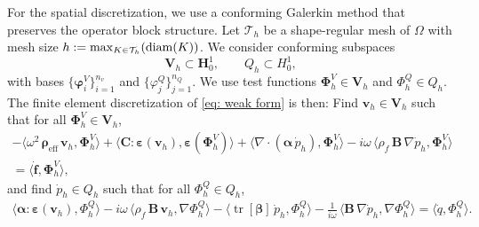 \documentclass[pdflatex,sn-mathphys-num]{sn-jnl}
\theoremstyle{thmstyleone}%
\theoremstyle{thmstyletwo}%
\theoremstyle{thmstylethree}%
\def \div {\nabla\cdot}
\theoremstyle{definition}
\begin{document}
	
	
	
	
	
	For the spatial discretization, we use a conforming Galerkin method that preserves the operator block structure. Let $\mathcal{T}_h$ be a shape-regular mesh of $\Omega$ with mesh size $h:= \max_{K\in\mathcal{T}_h}({\rm diam}(K))$. 
	We consider conforming subspaces
	\[
	\bm{V}_h \subset \bm{H}_{0}^{1}, 
	\qquad 
	Q_h \subset H_{0}^{1},
	\]
	with bases $\{\boldsymbol{\varphi}_i^V\}_{i=1}^{n_{{{v}}}}$ and $\{\varphi_j^Q\}_{j=1}^{n_Q}$. 
	We use test functions $\boldsymbol{\Phi}_h^V \in \bm{V}_h$ and $\Phi_h^{{Q}} \in Q_h$.
	The finite element discretization of \eqref{eq: weak form} is then: 
	Find $\mathbf{v}_h \in \bm{V}_h$ such that for all $\boldsymbol{\Phi}_h^V \in \bm{V}_h$,
	\begin{align*}
		-\langle \omega^2\, \boldsymbol{\rho}_{\mathrm{eff}}\, \mathbf{v}_h, \boldsymbol{\Phi}_h^V \rangle
		+ \big\langle \mathbf{C} : \boldsymbol{\varepsilon}(\mathbf{v}_h), \boldsymbol{\varepsilon}(\boldsymbol{\Phi}_h^V) \big\rangle
		+ \langle \div(\boldsymbol{\alpha}\, \dot{p}_h), \boldsymbol{\Phi}_h^V \rangle
		- i\omega\, \langle \rho_f\, \mathbf{B}\, \nabla \dot{p}_h, \boldsymbol{\Phi}_h^V \rangle
		\\= \langle \dot{\mathbf{f}}, \boldsymbol{\Phi}_h^V \rangle,
	\end{align*}
	and find $\dot{p}_h \in Q_h$ such that for all $\Phi_h^Q \in Q_h$,
	\begin{align*}
		\langle \boldsymbol{\alpha}: \boldsymbol{\varepsilon}(\mathbf{v}_h),  \Phi_h^Q \rangle
		- i\omega\, \langle \rho_f\, \mathbf{B}\, \mathbf{v}_h, \nabla \Phi_h^Q \rangle
		- \langle \operatorname{tr}[\boldsymbol{\beta}]\, \dot{p}_h, \Phi_h^Q \rangle
		- \frac{1}{i\omega}\, \langle \mathbf{B}\, \nabla \dot{p}_h, \nabla \Phi_h^Q \rangle
		= \langle \dot{q}, \Phi_h^Q \rangle.
	\end{align*}
	
	
	
\end{document}
